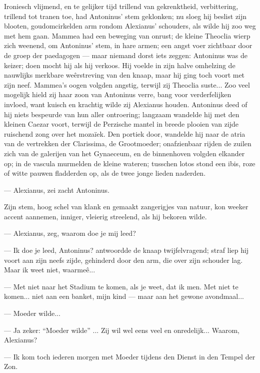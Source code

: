 \documentclass[a4paper, 12pt, oneside, dutch]{article}
\begin{document}
Ironiesch vlijmend, en te gelijker tijd trillend van gekrenktheid, verbittering, trillend tot tranen toe, had Antoninus' stem geklonken; nu sloeg hij beslist zijn blooten, goudomcirkelden arm rondom Alexianus' schouders, als wilde hij zoo weg met hem gaan. Mammea had een beweging van onrust; de kleine Theoclia wierp zich weenend, om Antoninus' stem, in hare armen; een angst voer zichtbaar door de groep der paedagogen --- maar niemand dorst iets zeggen: Antoninus was de keizer; doen mocht hij als hij verkoos. Hij voelde in zijn halve omhelzing de nauwlijks merkbare weêrstreving van den knaap, maar hij ging toch voort met zijn neef. Mammea's oogen volgden angstig, terwijl zij Theoclia suste... Zoo veel mogelijk hield zij haar zoon van Antoninus verre, bang voor verderfelijken invloed, want kuisch en krachtig wilde zij Alexianus houden. Antoninus deed of hij niets bespeurde van hun aller ontroering; langzaam wandelde hij met den kleinen Caezar voort, terwijl de Perzische mantel in breede plooien van zijde ruischend zong over het mozaïek. Den portiek door, wandelde hij naar de atria van de vertrekken der Clarissima, de Grootmoeder; onafzienbaar rijden de zuilen zich van de galerijen van het Gynaeceum, en de binnenhoven volgden elkander op; in de vascula murmelden de kleine wateren; tusschen lotos stond een ibis, roze of witte pauwen fladderden op, als de twee jonge lieden naderden.

--- Alexianus, zei zacht Antoninus.

Zijn stem, hoog schel van klank en gemaakt zangerigjes van natuur, kon weeker accent aannemen, inniger, vleierig streelend, als hij bekoren wilde.

--- Alexianus, zeg, waarom doe je mij leed?

--- Ik doe je leed, Antoninus? antwoordde de knaap twijfelvragend; straf liep hij voort aan zijn neefs zijde, gehinderd door den arm, die over zijn schouder lag. Maar ik weet niet, waarmeê...

--- Met niet naar het Stadium te komen, als je weet, dat ik men. Met niet te komen... niet aan een banket, mijn kind --- maar aan het gewone avondmaal...

--- Moeder wilde...

--- Ja zeker: "`Moeder wilde"' ... Zij wil wel eens veel en onredelijk... Waarom, Alexianus?

--- Ik kom toch iederen morgen met Moeder tijdens den Dienst in den Tempel der Zon.
\end{document}
